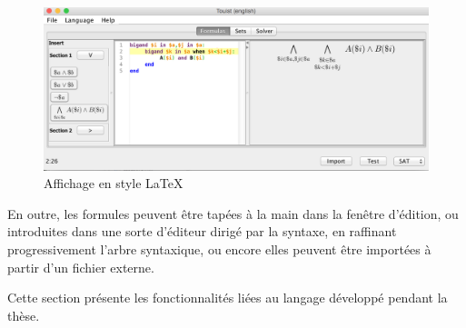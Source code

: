 \begin{figure}[htbp]
\centering
\includegraphics[scale=0.45]{Pictures/LatexDisplay.png}
  \caption{Affichage en style \LaTeX}
  \label{fig:LatexDisplay}
\end{figure}


En outre, les formules peuvent être tapées à la main dans la fenêtre d'édition, ou introduites dans une sorte d'éditeur dirigé par la syntaxe, en raffinant progressivement l'arbre syntaxique, ou encore elles peuvent être importées à partir d'un fichier externe.









Cette section présente les fonctionnalités liées au langage développé pendant la thèse.

